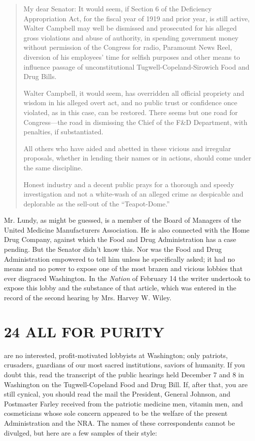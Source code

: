 \documentclass[nohyper,openany,nobib]{tufte-book}
\let\oldchapter\chapter
\def\chapter{%
  \setcounter{footnote}{0}%
  \oldchapter
}
\begin{document}
\begin{quote}
My dear Senator: It would seem, if Section 6 of the Deficiency
Appropriation Act, for the fiscal year of 1919 and prior year, is still
active, Walter Campbell may well be dismissed and prosecuted for his
alleged gross violations and abuse of authority, in spending government
money without permission of the Congress for radio, Paramount News Reel,
diversion of his employees' time for selfish purposes and other means to
influence passage of unconstitutional Tugwell-Copeland-Sirowich Food and
Drug Bills.

Walter Campbell, it would seem, has overridden all official propriety
and wisdom in his alleged overt act, and no public trust or confidence
once violated, as in this case, can be restored. There seems but one
road for Congress---the road in dismissing the Chief of the F\&D
Department, with penalties, if substantiated.

All others who have aided and abetted in these vicious and irregular
proposals, whether in lending their names or in actions, should come
under the same discipline.

Honest industry and a decent public prays for a thorough and speedy
investigation and not a white-wash of an alleged crime as despicable and
deplorable as the sell-out of the ``Teapot-Dome.''
\end{quote}

Mr. Lundy, as might be guessed, is a member of the Board of Managers of
the United Medicine Manufacturers Association. He is also connected with
the Home Drug Company, against which the Food and Drug Administration
has a case pending. But the Senator didn't know this. Nor was the Food
and Drug Administration empowered to tell him unless he specifically
asked; it had no means and no power to expose one of the most brazen and
vicious lobbies that ever disgraced Washington. In the \emph{Nation} of
February 14 the writer undertook to expose this lobby and the substance
of that article, which was entered in the record of the second hearing
by Mrs. Harvey W. Wiley.




\chapter[24 \hspace*{1mm} ALL FOR PURITY]{24 ALL FOR PURITY}

 are no interested, profit-motivated lobbyists at Washington; only
patriots, crusaders, guardians of our most sacred institutions, saviors
of humanity. If you doubt this, read the transcript of the public
hearings held December 7 and 8 in Washington on the Tugwell-Copeland
Food and Drug Bill. If, after that, you are still cynical, you should
read the mail the President, General Johnson, and Postmaster Farley
received from the patriotic medicine men, vitamin men, and cosmeticians
whose sole concern appeared to be the welfare of the present
Administration and the NRA. The names of these correspondents cannot be
divulged, but here are a few samples of their style:
\end{document}
